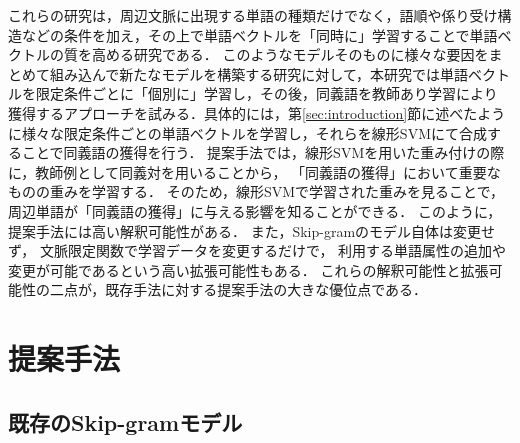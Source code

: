 \documentclass[japanese]{jnlp_1.4}
\begin{document}
これらの研究は，周辺文脈に出現する単語の種類だけでなく，語順や係り受け構造などの条件を加え，その上で単語ベクトルを「同時に」学習することで単語ベクトルの質を高める研究である．
このようなモデルそのものに様々な要因をまとめて組み込んで新たなモデルを構築する研究に対して，本研究では単語ベクトルを限定条件ごとに「個別に」学習し，その後，同義語を教師あり学習により
獲得するアプローチを試みる．具体的には，第\ref{sec:introduction}節に述べたように様々な限定条件ごとの単語ベクトルを学習し，それらを線形SVMにて合成することで同義語の獲得を行う．
提案手法では，線形SVMを用いた重み付けの際に，教師例として同義対を用いることから，
「同義語の獲得」において重要なものの重みを学習する．
そのため，線形SVMで学習された重みを見ることで，
周辺単語が「同義語の獲得」に与える影響を知ることができる．
このように，提案手法には高い解釈可能性がある．
また，Skip-gramのモデル自体は変更せず，
文脈限定関数で学習データを変更するだけで，
利用する単語属性の追加や変更が可能であるという高い拡張可能性もある．
これらの解釈可能性と拡張可能性の二点が，既存手法に対する提案手法の大きな優位点である．


\section{提案手法}
\label{sec:method}

\subsection{既存のSkip-gramモデル}
\label{subsec:method:skipgram}
\end{document}
